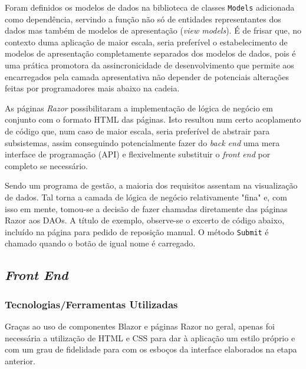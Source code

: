                     Foram definidos os modelos de dados na biblioteca de classes \texttt{Models} adicionada como dependência, servindo a função não só de entidades representantes dos dados mas também de modelos de apresentação (\textit{view models}). É de frisar que, no contexto duma aplicação de maior escala, seria preferível o estabelecimento de modelos de apresentação completamente separados dos modelos de dados, pois é uma prática promotora da assincronicidade de desenvolvimento que permite aos encarregados pela camada apresentativa não depender de potenciais alterações feitas por programadores mais abaixo na cadeia.
                    
                
                    \newpage
                    As páginas \textit{Razor} possibilitaram a implementação de lógica de negócio em conjunto com o formato HTML das páginas. Isto resultou num certo acoplamento de código que, num caso de maior escala, seria preferível de abstrair para subsistemas, assim conseguindo potencialmente fazer do \textit{back end} uma mera interface de programação (API) e flexivelmente substituir o \textit{front end} por completo se necessário.

                    Sendo um programa de gestão, a maioria dos requisitos assentam na visualização de dados. Tal torna a camada de lógica de negócio relativamente "fina" e, com isso em mente, tomou-se a decisão de fazer chamadas diretamente das páginas Razor aos DAOs. A título de exemplo, observe-se o excerto de código abaixo, incluído na página para pedido de reposição manual. O método \texttt{Submit} é chamado quando o botão de igual nome é carregado.
                    
                    
                    
        \newpage
        \subsection{\textit{Front End}}

            \subsubsection{Tecnologias/Ferramentas Utilizadas}
                Graças ao uso de componentes Blazor e páginas Razor no geral, apenas foi necessária a utilização de HTML e CSS para dar à aplicação um estilo próprio e com um grau de fidelidade para com os esboços da interface elaborados na etapa anterior.
                
